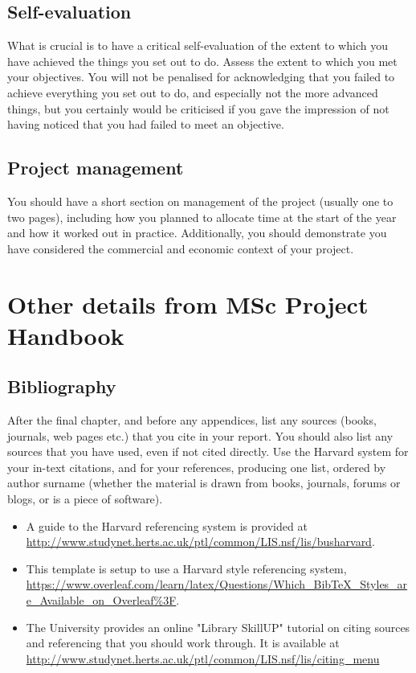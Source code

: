 \documentclass[a4paper, notitlepage, 11pt]{article}
\begin{document}
\subsection{Self-evaluation}
What is 
crucial is to have a critical self-evaluation of the extent to which you have achieved the things 
you set out to do. Assess the extent to which you met your objectives. You will not be penalised 
for acknowledging that you failed to achieve everything you set out to do, and especially not 
the more advanced things, but you certainly would be criticised if you gave the impression of 
not having noticed that you had failed to meet an objective.  

\subsection{Project management}
You  should  have  a  short  section  on  management  of  the  project  (usually  one  to  two  pages), 
including how you planned  to allocate time at the start of the year and how it  worked out  in 
practice.  Additionally,  you  should  demonstrate  you  have  considered  the  commercial  and 
economic context of your project.  

\section{Other details from MSc Project Handbook}

\subsection{Bibliography}

After the final chapter, and before any appendices, list any sources (books, journals, web pages 
etc.) that you cite in your report. You should also list any sources that you have used, even if 
not cited directly. Use the Harvard system for your in-text citations, and for your references, 
producing  one  list,  ordered  by  author  surname  (whether  the  material  is  drawn  from  books, 
journals, forums or blogs, or is a piece of software). 
\begin{itemize}
    \item A guide to the Harvard referencing system 
is provided at \url{http://www.studynet.herts.ac.uk/ptl/common/LIS.nsf/lis/busharvard}.
    \item This template is setup to use a Harvard style referencing system, \url{https://www.overleaf.com/learn/latex/Questions/Which_BibTeX_Styles_are_Available_on_Overleaf%3F}.
    \item The University provides an online "Library SkillUP" tutorial on citing sources and 
referencing that you should work through. It is available at 
\url{http://www.studynet.herts.ac.uk/ptl/common/LIS.nsf/lis/citing_menu }
\end{itemize}
\end{document}
